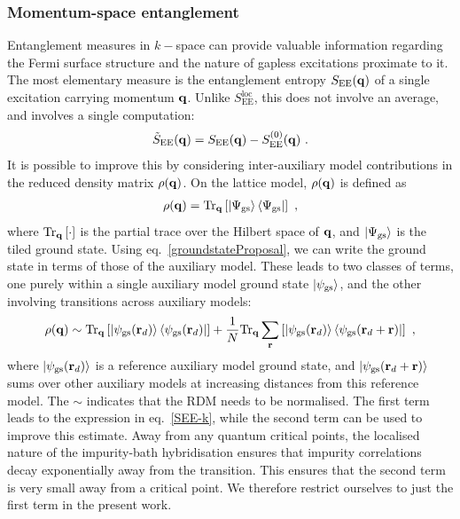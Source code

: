 \documentclass[reprint,hidelinks,onecolumn]{revtex4-2}
\begin{document}
\subsubsection{Momentum-space entanglement}
Entanglement measures in \(k-\)space can provide valuable information regarding the Fermi surface structure and the nature of gapless excitations proximate to it. The most elementary measure is the entanglement entropy \(S_\text{EE}({\bf q})\) of a single excitation carrying momentum \({\bf q}\). Unlike \(S_\text{EE}^\text{loc}\), this does not involve an average, and involves a single computation:
\begin{equation}\begin{aligned}
	\tilde S_\text{EE}({\bf q}) = S_\text{EE}({\bf q}) - S_\text{EE}^{(0)}({\bf q})~.
\end{aligned}\end{equation}
It is possible to improve this by considering inter-auxiliary model contributions in the reduced density matrix \(\rho({\bf q})\). On the lattice model, \(\rho({\bf q})\) is defined as
\begin{equation}\begin{aligned}\label{SEE-k}
	\rho({\bf q}) = \text{Tr}_{\bf q}\left[\ket{\Psi_\text{gs}}\bra{\Psi_\text{gs}}\right] ~,
\end{aligned}\end{equation}
where \(\text{Tr}_{\bf q}\left[\cdot\right]\) is the partial trace over the Hilbert space of \({\bf q}\), and \(\ket{\Psi_\text{gs}}\) is the tiled ground state. Using eq.~\ref{groundstateProposal}, we can write the ground state in terms of those of the auxiliary model. These leads to two classes of terms, one purely within a single auxiliary model ground state \(\ket{\psi_\text{gs}}\), and the other involving transitions across auxiliary models:
\begin{equation}\begin{aligned}\label{RDMTiled}
	\rho({\bf q}) \sim \text{Tr}_{\bf q}\left[\ket{\psi_\text{gs}({\bf r}_d)}\bra{\psi_\text{gs}({\bf r}_d)}\right] + \frac{1}{N}\text{Tr}_{\bf q}\sum_{{\bf r}}\left[\ket{\psi_\text{gs}({\bf r}_d)}\bra{\psi_\text{gs}({\bf r}_d + {\bf r})}\right]~,
\end{aligned}\end{equation}
where \(\ket{\psi_\text{gs}({\bf r}_d)}\) is a reference auxiliary model ground state, and \(\ket{\psi_\text{gs}({\bf r}_d + {\bf r})}\) sums over other auxiliary models at increasing distances from this reference model. The \(\sim\) indicates that the RDM needs to be normalised. The first term leads to the expression in eq.~\ref{SEE-k}, while the second term can be used to improve this estimate. Away from any quantum critical points, the localised nature of the impurity-bath hybridisation ensures that impurity correlations decay exponentially away from the transition. This ensures that the second term is very small away from a critical point. We therefore restrict ourselves to just the first term in the present work.
\end{document}
